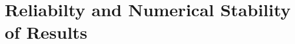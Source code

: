 \section{Reliabilty and Numerical Stability of Results}
\label{sec:ReliabiltyAndNumericalStability}

